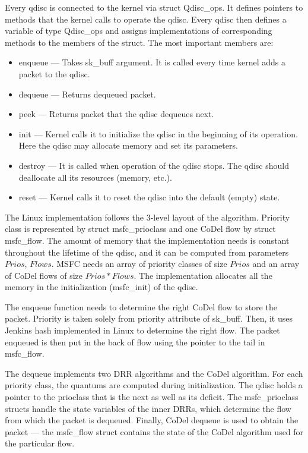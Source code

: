 Every qdisc is connected to the kernel via struct Qdisc\_ops. It defines pointers to methods that the kernel calls to operate the qdisc. Every qdisc then defines a variable of type Qdisc\_ops and assigns implementations of corresponding methods to the members of the struct. The most important members are:
\begin{itemize}
	\item enqueue --- Takes sk\_buff argument. It is called every time kernel adds a packet to the qdisc.
	\item dequeue --- Returns dequeued packet.
	\item peek --- Returns packet that the qdisc dequeues next.
	\item init --- Kernel calls it to initialize the qdisc in the beginning of its operation. Here the qdisc may allocate memory and set its parameters.
	\item destroy --- It is called when operation of the qdisc stops. The qdisc should deallocate all its resources (memory, etc.).
	\item reset --- Kernel calls it to reset the qdisc into the default (empty) state.
\end{itemize}

The Linux implementation follows the 3-level layout of the algorithm. Priority class is represented by struct msfc\_prioclass and one CoDel flow by struct msfc\_flow. The amount of memory that the implementation needs is constant throughout the lifetime of the qdisc, and it can be computed from parameters $Prios$, $Flows$. MSFC needs an array of priority classes of size $Prios$ and an array of CoDel flows of size $Prios * Flows$. The implementation allocates all the memory in the initialization (msfc\_init) of the qdisc.

The enqueue function needs to determine the right CoDel flow to store the packet. Priority is taken solely from priority attribute of sk\_buff. Then, it uses Jenkins hash implemented in Linux to determine the right flow. The packet enqueued is then put in the back of flow using the pointer to the tail in msfc\_flow. 

The dequeue implements two DRR algorithms and the CoDel algorithm. For each priority class, the quantums are computed during initialization. The qdisc holds a pointer to the prioclass that is the next as well as its deficit. The msfc\_prioclass structs handle the state variables of the inner DRRs, which determine the flow from which the packet is dequeued. Finally, CoDel dequeue is used to obtain the packet --- the msfc\_flow struct contains the state of the CoDel algorithm used for the particular flow.

